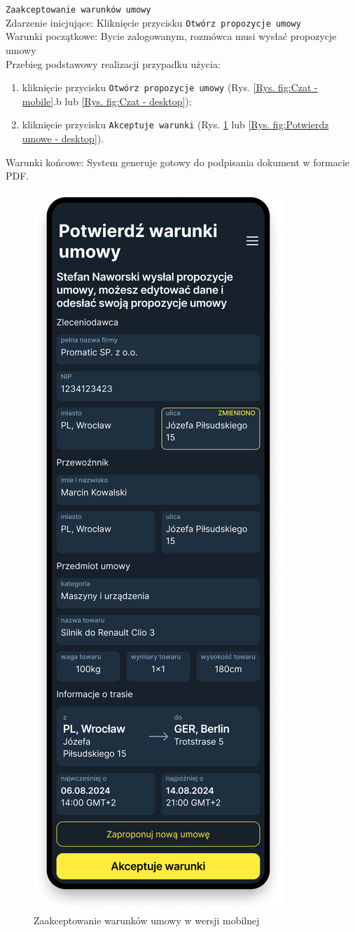 \texttt{Zaakceptowanie warunków umowy} \\
Zdarzenie inicjujące: Kliknięcie przycisku \texttt{Otwórz propozycje umowy} \\
Warunki początkowe: Bycie zalogowanym, rozmówca musi wysłać propozycje umowy \\
Przebieg podstawowy realizacji przypadku użycia: \\
\begin{enumerate}
    \item kliknięcie przycisku \texttt{Otwórz propozycje umowy} (Rys. \ref{Rys. fig:Czat - mobile}.b lub \ref{Rys. fig:Czat - desktop});
    \item kliknięcie przycisku \texttt{Akceptuje warunki} (Rys. \ref{Rys. fig:Potwierdz umowe - mobile} lub \ref{Rys. fig:Potwierdz umowe - desktop}).
\end{enumerate}
Warunki końcowe: System generuje gotowy do podpisania dokument w formacie PDF. \\
\begin{figure}[H]
	\centering
		\includegraphics[width=0.3\linewidth]{rozdzial1/potwierdz_umowe_m.png}
	\caption{Zaakceptowanie warunków umowy w wersji mobilnej}
	\label{Rys. fig:Potwierdz umowe - mobile}
\end{figure}
